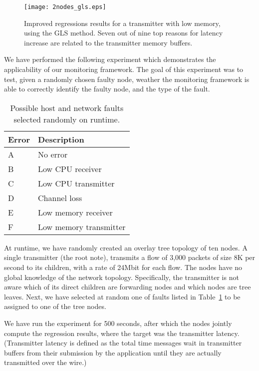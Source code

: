 \documentclass[times, 10pt,twocolumn]{article}
\begin{document}
\begin{figure}[ht!]
\begin{center}
\texttt{[image: 2nodes\_gls.eps]}\\
 \caption{Improved regressions results for a transmitter with low memory, using the GLS method. Seven out of nine top reasons for latency increase are related to the transmitter memory buffers.}
\label{fig:gen_lin_reg}
\end{center}
\end{figure}










We have performed the following experiment which demonstrates the applicability of our monitoring framework.
The goal of this experiment was to test, given a randomly chosen faulty node, weather the monitoring framework
is able to correctly identify the faulty node, and the type of the fault.




\begin{table}
  \centering
\begin{tabular}{|l|l|}
  \hline
  Error & Description \\ \hline
A & No error \\
  B & Low CPU receiver \\
  C & Low CPU transmitter \\
  D & Channel loss\\
E & Low memory receiver \\
  F & Low memory transmitter \\
   \hline
\end{tabular}
  \caption{Possible host and network faults selected randomly on runtime.}\label{tab:kfaults}
\end{table}

At runtime, we have randomly created an overlay tree topology of ten nodes. A single transmitter (the root note), transmits a flow of 3,000 packets of size 8K per second to its children, with a rate of 24Mbit for each flow. The nodes have no global knowledge of the network topology. Specifically, the transmitter is not aware which of its direct
children are forwarding nodes and which nodes are tree leaves. Next, we have selected at random one of faults listed in Table~\ref{tab:kfaults} to be assigned to one of the tree nodes.

We have run the experiment for 500 seconds, after which the nodes jointly compute the regression results, where the target was the transmitter latency. (Transmitter latency is defined as the total time messages wait in transmitter buffers from their submission by the application until they are actually transmitted over the wire.)
\end{document}
